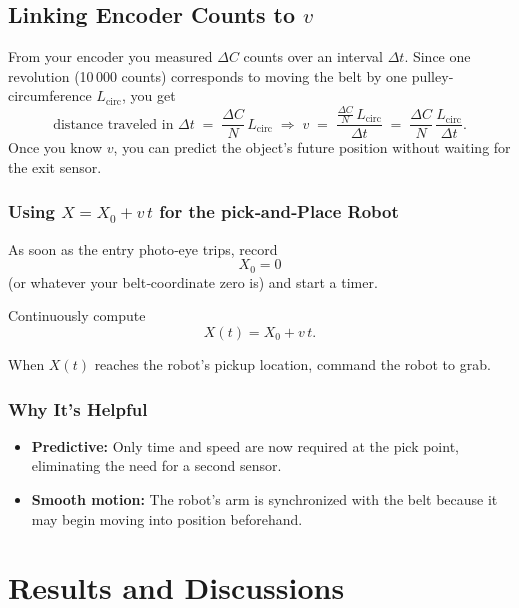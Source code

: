 \documentclass[12pt]{article}
\begin{document}
\subsection*{Linking Encoder Counts to \(v\)}

From your encoder you measured \(\Delta C\) counts over an interval \(\Delta t\). Since one revolution (10\,000 counts) corresponds to moving the belt by one pulley‐circumference \(L_{\mathrm{circ}}\), you get
\[
\text{distance traveled in }\Delta t
\;=\;\frac{\Delta C}{N}\,L_{\mathrm{circ}}
\;\Longrightarrow\;
v
\;=\;\frac{\displaystyle\frac{\Delta C}{N}\,L_{\mathrm{circ}}}{\Delta t}
\;=\;\frac{\Delta C}{N}\,\frac{L_{\mathrm{circ}}}{\Delta t}.
\]
Once you know \(v\), you can predict the object’s future position without waiting for the exit sensor\cite{ref27}.

\subsubsection*{Using \(X = X_0 + v\,t\) for the pick‑and‑Place Robot}

As soon as the entry photo‑eye trips, record
\[
X_0 = 0
\]
(or whatever your belt‑coordinate zero is) and start a timer.

Continuously compute
\[
X(t) = X_0 + v\,t.
\]

When \(X(t)\) reaches the robot’s pickup location, command the robot to grab.

\subsubsection*{Why It’s Helpful}
\begin{itemize}
  \item \textbf{Predictive:} Only time and speed are now required at the pick point, eliminating the need for a second sensor.
  \item \textbf{Smooth motion:} The robot's arm is synchronized with the belt because it may begin moving into position beforehand.

\end{itemize}


\newpage



\newpage
\section{Results and Discussions}
\end{document}
